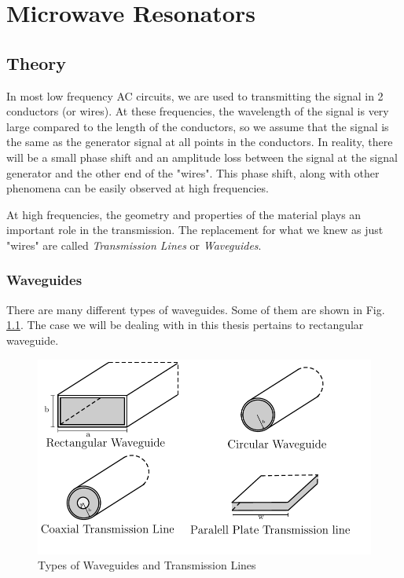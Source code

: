 
\chapter{Microwave Resonators} %

\label{Chapter2} %


\section{Theory}

In most low frequency AC circuits, we are used to transmitting the signal in 2 conductors (or wires). At these frequencies, the wavelength of the signal is very large compared to the length of the conductors, so we assume that the signal is the same as the generator signal at all points in the conductors. In reality, there will be a small phase shift and an amplitude loss between the signal at the signal generator and the other end of the "wires". This phase shift, along with other phenomena can be easily observed at high frequencies.

At high frequencies, the geometry and properties of the material plays an important role in the transmission. The replacement for what we knew as just "wires" are called \textit{Transmission Lines} or \textit{Waveguides}.

\subsection{Waveguides}

There are many different types of waveguides. Some of them are shown in Fig. \ref{fig:waveguides}. The case we will be dealing with in this thesis pertains to rectangular waveguide.

\begin{figure}
\centering
\includegraphics{Figures/Waveguides}
\decoRule
\caption[Waveguide Types]{Types of Waveguides and Transmission Lines}
\label{fig:waveguides}
\end{figure}

